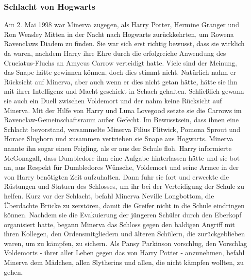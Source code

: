 \documentclass[a4paper, 10pt]{article}
\begin{document}
\subsubsection*{\large Schlacht von Hogwarts}
Am 2. Mai 1998 war Minerva zugegen, als Harry Potter, Hermine Granger und Ron Weasley Mitten in der Nacht nach Hogwarts zurückkehrten, um Rowena Ravenclaws Diadem zu finden. Sie war sich erst richtig bewusst, dass sie wirklich da waren, nachdem Harry ihre Ehre durch die erfolgreiche Anwendung des Cruciatus-Fluchs an Amycus Carrow verteidigt hatte.
\vspace{10pt}
\newline
Viele sind der Meinung, das Snape hätte gewinnen können, doch dies stimmt nicht.
\vspace{10pt}
\newline
Natürlich nahm er Rücksicht auf Minerva, aber auch wenn er dies nicht getan hätte, hätte sie ihn mit ihrer Intelligenz und Macht geschickt in Schach gehalten. Schließlich gewann sie auch ein Duell zwischen Voldemort und der nahm keine Rücksicht auf Minerva. Mit der Hilfe von Harry und Luna Lovegood setzte sie die Carrows im Ravenclaw-Gemeinschaftsraum außer Gefecht. Im Bewusstsein, dass ihnen eine Schlacht bevorstand, versammelte Minerva Filius Flitwick, Pomona Sprout und Horace Slughorn und zusammen vertrieben sie Snape aus Hogwarts. Minerva nannte ihn sogar einen Feigling, als er aus der Schule floh. Harry informierte McGonagall, dass Dumbledore ihm eine Aufgabe hinterlassen hätte und sie bot an, aus Respekt für Dumbledores Wünsche, Voldemort und seine Armee in der von Harry benötigten Zeit aufzuhalten. Dann fuhr sie fort und erweckte die Rüstungen und Statuen des Schlosses, um ihr bei der Verteidigung der Schule zu helfen. Kurz vor der Schlacht, befahl Minerva Neville Longbottom, die Überdachte Brücke zu zerstören, damit die Greifer nicht in die Schule eindringen können.
\vspace{10pt}
\newline
Nachdem sie die Evakuierung der jüngeren Schüler durch den Eberkopf organisiert hatte, begann Minerva das Schloss gegen den baldigen Angriff mit ihren Kollegen, den Ordensmitgliedern und älteren Schülern, die zurückgeblieben waren, um zu kämpfen, zu sichern. Als Pansy Parkinson vorschlug, den Vorschlag Voldemorts - ihrer aller Leben gegen das von Harry Potter - anzunehmen, befahl Minerva dem Mädchen, allen Slytherins und allen, die nicht kämpfen wollten, zu gehen.
\vspace{10pt}
\newline
\end{document}
